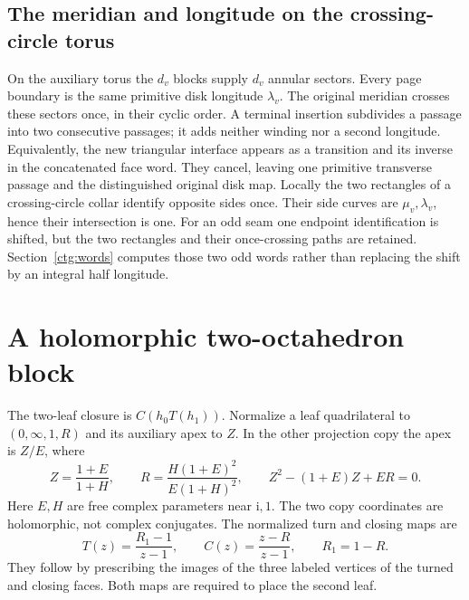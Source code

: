 \documentclass[11pt]{article}
\numberwithin{equation}{section}
\theoremstyle{definition}
\theoremstyle{remark}
\newcommand{\ii}{\mathrm i}
\begin{document}
\subsection{The meridian and longitude on the crossing-circle torus}
\label{ctg:collar-topology}
On the auxiliary torus the $d_v$ blocks supply $d_v$ annular sectors.
Every page boundary is the same primitive disk longitude $\lambda_v$.
The original meridian crosses these sectors once, in their cyclic
order. A terminal insertion subdivides a passage into two consecutive
passages; it adds neither winding nor a second longitude.
Equivalently, the new triangular interface appears as a transition
and its inverse in the concatenated face word. They cancel, leaving
one primitive transverse passage and the distinguished original disk
map. Locally the two rectangles of a crossing-circle collar identify
opposite sides once. Their side curves are $\mu_v,\lambda_v$, hence
their intersection is one. For an odd seam one endpoint identification
is shifted, but the two rectangles and their once-crossing paths are
retained. Section~\ref{ctg:words} computes those two odd words rather
than replacing the shift by an integral half longitude.

\section{A holomorphic two-octahedron block}
\label{ctg:blocks}

The two-leaf closure is $C(h_0T(h_1))$. Normalize a leaf quadrilateral
to $(0,\infty,1,R)$ and its auxiliary apex to $Z$. In the other
projection copy the apex is $Z/E$, where
\begin{equation}\label{ctg:leaf-coordinates}
 Z=\frac{1+E}{1+H},\qquad
 R=\frac{H(1+E)^2}{E(1+H)^2},\qquad
 Z^2-(1+E)Z+ER=0.
\end{equation}
Here $E,H$ are free complex parameters near $\ii,1$. The two copy
coordinates are holomorphic, not complex conjugates. The normalized
turn and closing maps are
\begin{equation}\label{ctg:turn-close}
 T(z)=\frac{R_1-1}{z-1},\qquad C(z)=\frac{z-R}{z-1},\qquad R_1=1-R.
\end{equation}
They follow by prescribing the images of the three labeled vertices
of the turned and closing faces. Both maps are required to place the
second leaf.
\end{document}
